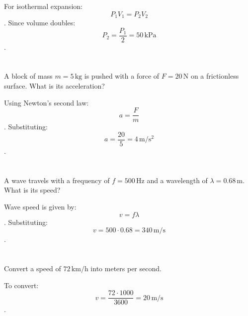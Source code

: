 \documentclass{article}
\begin{document}
For isothermal expansion: \[ P_1 V_1 = P_2 V_2 \]. Since volume doubles: \[ P_2 = \frac{P_1}{2} = 50 \, \mathrm{kPa} \].

\section{}
A block of mass \( m = 5 \, \mathrm{kg} \) is pushed with a force of \( F = 20 \, \mathrm{N} \) on a frictionless surface. What is its acceleration?

Using Newton's second law: \[ a = \frac{F}{m} \]. Substituting: \[ a = \frac{20}{5} = 4 \, \mathrm{m/s^2} \].

\section{}
A wave travels with a frequency of \( f = 500 \, \mathrm{Hz} \) and a wavelength of \( \lambda = 0.68 \, \mathrm{m} \). What is its speed?

Wave speed is given by: \[ v = f \lambda \]. Substituting: \[ v = 500 \cdot 0.68 = 340 \, \mathrm{m/s} \].

\section{}
Convert a speed of \( 72 \, \mathrm{km/h} \) into meters per second.

To convert: \[ v = \frac{72 \cdot 1000}{3600} = 20 \, \mathrm{m/s} \].
\end{document}

